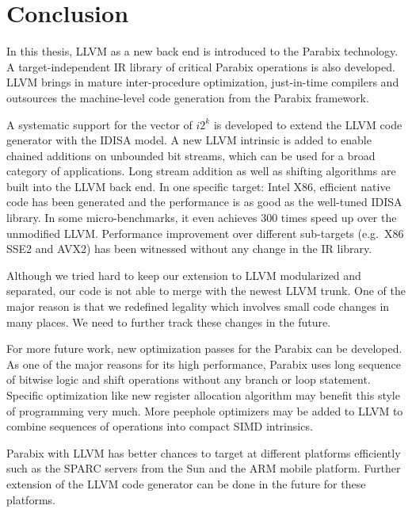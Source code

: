%
%
\chapter{Conclusion}
\label{seven}

In this thesis, LLVM as a new back end is introduced to the Parabix technology. A target-independent IR library of critical Parabix operations is also developed. LLVM brings in mature inter-procedure optimization, just-in-time compilers and outsources the machine-level code generation from the Parabix framework.

A systematic support for the vector of $i2^k$ is developed to extend the LLVM code generator with the IDISA model. A new LLVM intrinsic is added to enable chained additions on unbounded bit streams, which can be used for a broad category of applications. Long stream addition as well as shifting algorithms are built into the LLVM back end. In one specific target: Intel X86, efficient native code has been generated and the performance is as good as the well-tuned IDISA library. In some micro-benchmarks, it even achieves 300 times speed up over the unmodified LLVM\@. Performance improvement over different sub-targets (e.g.\ X86 SSE2 and AVX2) has been witnessed without any change in the IR library.

Although we tried hard to keep our extension to LLVM modularized and separated, our code is not able to merge with the newest LLVM trunk. One of the major reason is that we redefined legality which involves small code changes in many places. We need to further track these changes in the future.

For more future work, new optimization passes for the Parabix can be developed. As one of the major reasons for its high performance, Parabix uses long sequence of bitwise logic and shift operations without any branch or loop statement. Specific optimization like new register allocation algorithm may benefit this style of programming very much. More peephole optimizers may be added to LLVM to combine sequences of operations into compact SIMD intrinsics.

Parabix with LLVM has better chances to target at different platforms efficiently such as the SPARC servers from the Sun and the ARM mobile platform. Further extension of the LLVM code generator can be done in the future for these platforms.

